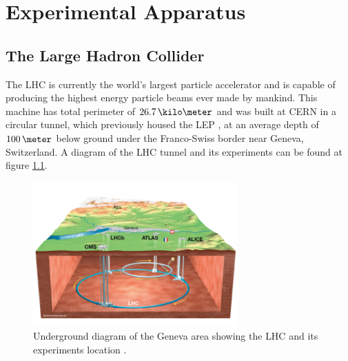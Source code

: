 \chapter{Experimental Apparatus}
\label{CHAPTER:ExperimentalApparatus}


\section{The Large Hadron Collider}
\label{SECTION:ExperimentalApparatus_LHC}

%

%  

The \gls{LHC} \cite{ARTICLE:LHCDesignReportVol1,ARTICLE:LHCMachine} is currently the world's largest particle accelerator and is capable of producing the highest energy particle beams ever made by mankind. This machine has total perimeter of $26.7\,\kilo\meter$ and was built at \gls{CERN} in a circular tunnel, which previously housed the \gls{LEP} \cite{LEPTDR:LEPInjectorStudyGroup}, at an average depth of $100\,\meter$ below ground under the Franco-Swiss border near Geneva, Switzerland. A diagram of the \gls{LHC} tunnel and its experiments can be found at figure \ref{FIGURE:ExperimentalApparatus_LHCLayoutUnderground}.

\begin{figure}[!htb]
  \centering
  \includegraphics[width=0.70\textwidth]{Chapter02/LHC/Images/LHCUnderGroundDiagram.png}
  \caption{Underground diagram of the Geneva area showing the \gls{LHC} and its experiments location \cite{IMAGEREF:LHCDiagram}.}
  \label{FIGURE:ExperimentalApparatus_LHCLayoutUnderground}
\end{figure}

